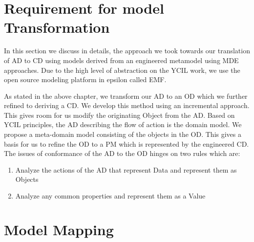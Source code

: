 \documentclass[10pt]{article}
\begin{document}
\section{Requirement for model Transformation}
In this section we discuss in details, the approach we took towards our translation of AD to CD using models derived from an engineered metamodel using MDE approaches. Due to the high level of abstraction on the YCIL work, we use the open source modeling platform in epsilon called EMF.

As stated in the above chapter, we transform our AD to an OD which we further refined to deriving a CD. We develop this method using an incremental approach. This gives room for us modify the originating Object from the AD. Based on YCIL principles, the AD describing the flow of action is the domain model. We propose a meta-domain model consisting of the objects in the OD. This gives a basis for us to refine the OD to a PM which is represented by the engineered CD. The issues of conformance of the AD to the OD hinges on two rules which are:
\begin{enumerate}
\item Analyze the actions of the AD that represent Data and represent them as Objects
\item Analyze any common properties and represent them as a Value
\end{enumerate}

\section{Model Mapping}





  
\end{document}
